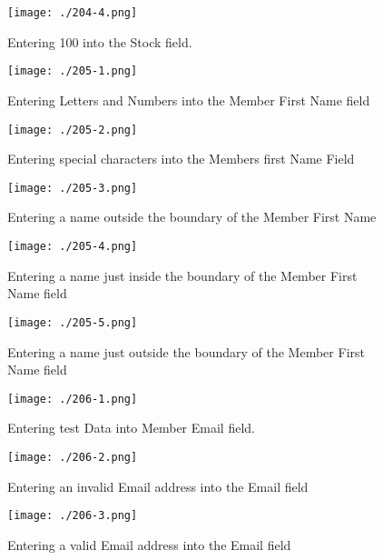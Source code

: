 \begin{figure}[H]
    \texttt{[image: ./204-4.png]}
    \caption{Entering 100 into the Stock field.} \label{fig:204-4}
\end{figure}

\begin{figure}[H]
    \texttt{[image: ./205-1.png]}
    \caption{Entering Letters and Numbers into the Member First Name field} \label{fig:205-1}
\end{figure}

\begin{figure}[H]
    \texttt{[image: ./205-2.png]}
    \caption{Entering special characters into the Members first Name Field} \label{fig:205-2}
\end{figure}

\begin{figure}[H]
    \texttt{[image: ./205-3.png]}
    \caption{Entering a name outside the boundary of the Member First Name} \label{fig:205-3}
\end{figure}

\begin{figure}[H]
    \texttt{[image: ./205-4.png]}
    \caption{Entering a name just inside the boundary of the Member First Name field} \label{fig:205-4}
\end{figure}

\begin{figure}[H]
    \texttt{[image: ./205-5.png]}
    \caption{Entering a name just outside the boundary of the Member First Name field} \label{fig:205-5}
\end{figure}

\begin{figure}[H]
    \texttt{[image: ./206-1.png]}
    \caption{Entering test Data into Member Email field.} \label{fig:206-1}
\end{figure}

\begin{figure}[H]
    \texttt{[image: ./206-2.png]}
    \caption{Entering an invalid Email address into the Email field} \label{fig:206-2}
\end{figure}

\begin{figure}[H]
    \texttt{[image: ./206-3.png]}
    \caption{Entering a valid Email address into the Email field} \label{fig:206-3}
\end{figure}

